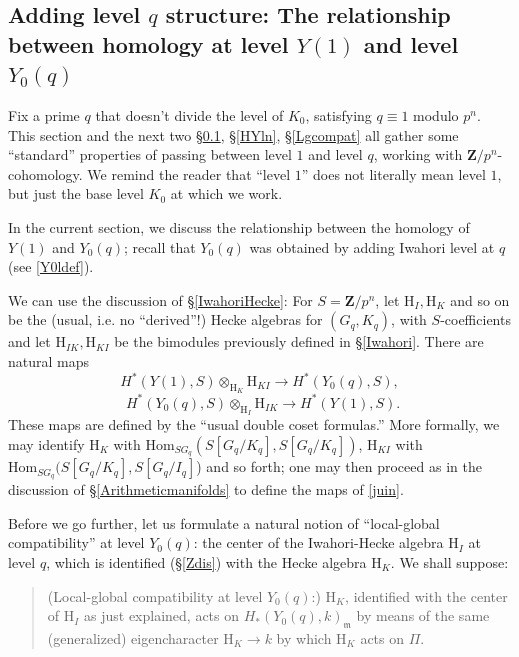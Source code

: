 \documentclass[10pt]{amsart}
\newcommand{\Z}{\mathbf{Z}}
\newcommand{\Hom}{\mathrm{Hom}}
\theoremstyle{remark}
\begin{document}
  
 
  
 
  
  


\subsection{ Adding level $q$ structure: The relationship between homology at level $Y(1)$ and level $Y_0(q)$ } \label{Morita}

Fix a prime $q$ that doesn't divide the level of $K_0$, satisfying
$q \equiv 1$ modulo $p^n$. 
This section and the next two \S \ref{Morita}, \S \ref{HYln},   \S \ref{Lgcompat} all gather some ``standard'' properties of passing  between level $1$ and level $q$,
working with $\Z/p^n$-cohomology. 
We   remind the reader that ``level $1$'' does not literally mean level $1$, but just the base level $K_0$ at which we work.


In the current section, we discuss the relationship between the homology of $Y(1)$ and $Y_0(q)$; recall that $Y_0(q)$ was obtained
by adding Iwahori level at $q$ (see \eqref{Y0ldef}). 


   


We can use the discussion of \S \ref{IwahoriHecke}:  
For $S=\Z/p^n$,  let $\mathrm{H}_I, \mathrm{H}_K$ and so on be the (usual, i.e. no ``derived''!) Hecke algebras for $(G_{q}, K_{q})$, with $S$-coefficients 
 and let $\mathrm{H}_{IK}, \mathrm{H}_{KI}$ be the bimodules previously defined in \S \ref{Iwahori}. 
 There are  natural maps
\begin{equation} \label{juin} H^*(Y(1),S) \otimes_{\mathrm{H}_{K}} \mathrm{H}_{KI} \longrightarrow H^*(Y_0(q),S),\end{equation}
$$   \ \ H^*(Y_0(q),S) \otimes_{\mathrm{H}_{I}} \mathrm{H}_{IK} \longrightarrow H^*(Y(1),S).
$$  
These maps are defined by the ``usual double coset formulas.'' More formally, we may identify  $\mathrm{H}_K$ with $\Hom_{SG_q} (S[G_q/K_q], S[G_q/K_q])$,  
$\mathrm{H}_{KI}$ with $\Hom_{SG_q}(S[G_q/K_q], S[G_q/I_q]$) and so forth;   one may then   proceed as in the discussion of
\S \ref{Arithmeticmanifolds}  to define the maps of \eqref{juin}. 
 
 Before we go further, let us formulate a natural notion of   ``local-global compatibility'' at level $Y_0(q)$: 
  the center of the Iwahori-Hecke algebra $\mathrm{H}_I$ at level $q$,
which is identified (\S \ref{Zdis}) with the Hecke algebra $\mathrm{H}_K$. We shall suppose:  \begin{quote} (Local-global compatibility at level $Y_0(q)$:) 
$\mathrm{H}_K$, identified with the center of $\mathrm{H}_I$ as just explained, acts on $H_*(Y_0(q), k)_{\mathfrak{m}}$ by means of the same (generalized)  eigencharacter $\mathrm{H}_K \rightarrow k$
by which $\mathrm{H}_K$ acts on $\Pi$.  
\end{quote} 
\end{document}
